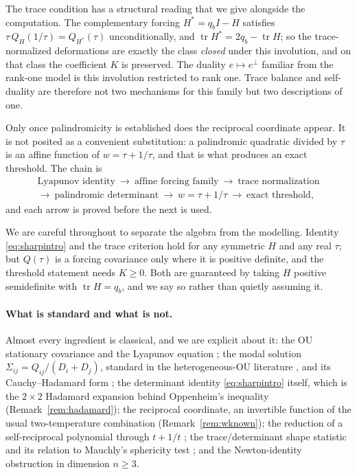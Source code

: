 \documentclass[11pt]{article}
\theoremstyle{plain}
\theoremstyle{definition}
\theoremstyle{remark}
\newcommand{\tr}{\operatorname{tr}}
\newcommand{\Sig}{\Sigma}
\newcommand{\eperp}{e^{\perp}}
\begin{document}
The trace condition has a structural reading that we give alongside the computation. The
complementary forcing $H^{*}=q_bI-H$ satisfies $\tau\,Q_H(1/\tau)=Q_{H^{*}}(\tau)$
unconditionally, and $\tr H^{*}=2q_b-\tr H$; so the trace-normalized deformations are exactly
the class \emph{closed} under this involution, and on that class the coefficient $K$ is
preserved. The duality $e\mapsto\eperp$ familiar from the rank-one model is this involution
restricted to rank one. Trace balance and self-duality are therefore not two mechanisms for this
family but two descriptions of one.

Only once palindromicity is established does the reciprocal coordinate appear. It is not posited
as a convenient substitution: a palindromic quadratic divided by $\tau$ is an affine function of
$w=\tau+1/\tau$, and that is what produces an exact threshold. The chain is
\[
\begin{gathered}
  \text{Lyapunov identity}\ \to\ \text{affine forcing family}\ \to\ \text{trace normalization}\\
  \to\ \text{palindromic determinant}\ \to\ w=\tau+1/\tau\ \to\ \text{exact threshold},
\end{gathered}
\]
and each arrow is proved before the next is used.

We are careful throughout to separate the algebra from the modelling. Identity
\eqref{eq:sharpintro} and the trace criterion hold for any symmetric $H$ and any real $\tau$;
but $Q(\tau)$ is a forcing covariance only where it is positive definite, and the threshold
statement needs $K\ge0$. Both are guaranteed by taking $H$ positive semidefinite with
$\tr H=q_b$, and we say so rather than quietly assuming it.

\paragraph{What is standard and what is not.} Almost every ingredient is classical, and we are
explicit about it: the OU stationary covariance and the Lyapunov equation \cite{Gardiner2004};
the modal solution $\Sig_{ij}=Q_{ij}/(D_i+D_j)$, standard in the heterogeneous-OU literature
\cite{Barucca2014,GodrecheLuck2019}, and its Cauchy--Hadamard form
\cite{PalittaLefteriu2022,YadykinEtAl2023}; the determinant identity \eqref{eq:sharpintro}
itself, which is the $2\times2$ Hadamard expansion behind Oppenheim's inequality
(Remark~\ref{rem:hadamard}); the reciprocal coordinate, an invertible function of the usual
two-temperature combination (Remark~\ref{rem:wknown}); the reduction of a self-reciprocal
polynomial through $t+1/t$ \cite{Vieira2019}; the trace/determinant shape statistic and its
relation to Mauchly's sphericity test \cite{Mauchly1940,Muirhead1982}; and the Newton-identity
obstruction in dimension $n\ge3$.
\end{document}
